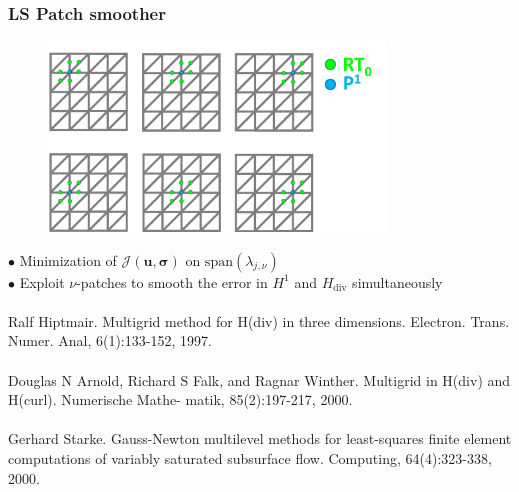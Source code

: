 \documentclass[8pt, oneside]{beamer}   	%
\newcommand{\bu}{\textbf{u}}
\newcommand{\bsigma}{\boldsymbol{\sigma}}
\newcommand{\titlecolor}[1]{\frametitle{\textcolor{dkgrey}{ \textbf{#1}}}}
\begin{document}

\begin{frame}
\titlecolor{LS Patch smoother}
\footnotesize

\begin{figure}[htbp!]
	\includegraphics[width=0.8\textwidth]{img/patchsmoother.pdf}
		\label{abb_arc}
\end{figure}
$\bullet$ Minimization of $\mathcal{J}(\bu,\bsigma)$ on $\text{span}(\lambda_{j,\nu})$\\
$\bullet$ Exploit $\nu$-patches to smooth the error in $H^1$ and $H_{\text{div}}$ simultaneously\\
${}$\\
\tiny{Ralf Hiptmair. Multigrid method for H(div) in three dimensions. Electron. Trans. Numer. Anal, 6(1):133-152, 1997.}${}$\\
${}$\\
\tiny{Douglas N Arnold, Richard S Falk, and Ragnar Winther. Multigrid in H(div) and H(curl). Numerische Mathe-
matik, 85(2):197-217, 2000.}
${}$\\
${}$\\
\tiny{
Gerhard Starke. Gauss-Newton multilevel methods for least-squares finite element computations of variably saturated subsurface flow. Computing, 64(4):323-338, 2000.}

\end{frame}
\end{document}
